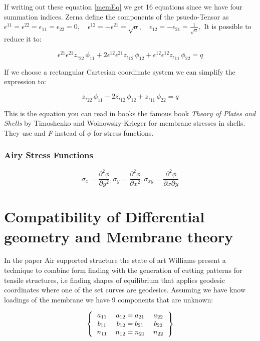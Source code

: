 If writing out these equation \ref{memEq} we get 16 equations since we have four summation indices. Zerna define the components of the  psuedo-Tensor as $\epsilon^{11} = \epsilon^{22}=\epsilon_{11}=\epsilon_{22} = 0,\quad \epsilon^{12} = -\epsilon^{21} = \sqrt{a},\quad \epsilon_{12} = -\epsilon_{21} = \frac{1}{\sqrt{a}},$ It is possible to reduce it to:

\begin{equation}
    \epsilon^{21}\epsilon^{21}z,_{22}\phi_{11} + 2\epsilon^{12}\epsilon^{21}z,_{12}\phi_{12} + \epsilon^{12}\epsilon^{12}z,_{11}\phi_{22} = q
\end{equation}

If we choose a rectangular Cartesian coordinate system we can simplify the expression to:

\begin{equation}
    z,_{22}\phi_{11} -2 z,_{12}\phi_{12} + z,_{11}\phi_{22} = q
\end{equation}

This is the equation you can read in books the famous book \textit{Theory of Plates and Shells} by Timoshenko and Woinowsky-Krieger for membrane stresses in shells. They use and \textit{F} instead of $\phi$ for stress functions.

\subsubsection{Airy Stress Functions}

    
\begin{equation}
\sigma_x = \frac{\partial^2\phi}{\partial y^2}, \sigma_y = \frac{\partial^2\phi}{\partial x^2}, \sigma_{xy} = \frac{\partial^2\phi}{\partial x \partial y}
\end{equation}
\newpage
\section{Compatibility of Differential geometry and Membrane theory}

In the paper Air supported structure the state of art Williams present a technique to combine form finding with the generation of cutting patterns for tensile structures, i.e finding shapes of equilibrium that applies geodesic coordinates where one of the set curves are geodesics. 
Assuming we have know loadings of the membrane we have 9 components that are unknown:

\[ 
\left \{
  \begin{tabular}{ccc}
  $a_{11}$  & $a_{12} =a_{21} $ & $a_{22}$ \\
 $b_{11}$  & $b_{12} =b_{21} $ & $b_{22}$\\
  $n_{11}$  & $n_{12} =n_{21} $ & $n_{22}$ 
  \end{tabular}
\right \}
\]

